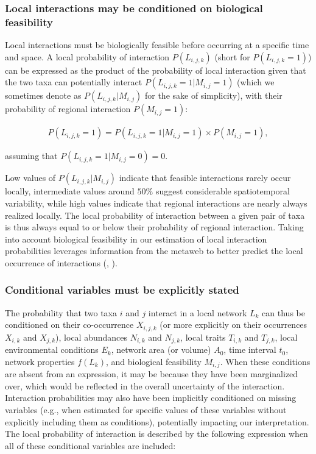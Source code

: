 \subsubsection{Local interactions may be conditioned on biological feasibility}

Local interactions must be biologically feasible before occurring at a specific
time and space. A local probability of interaction $P(L_{i, j, k})$ (short for
$P(L_{i, j, k} = 1)$) can be expressed as the product of the probability of
local interaction given that the two taxa can potentially interact $P(L_{i, j,
k} = 1 | M_{i, j} = 1)$ (which we sometimes denote as $P(L_{i, j, k}|M_{i, j})$
for the sake of simplicity), with their probability of regional interaction
$P(M_{i, j} = 1)$: 

\begin{eqnarray}
  \label{eq:local_meta}
  P(L_{i, j, k} = 1) = P(L_{i, j, k} = 1 | M_{i, j} = 1) \times P(M_{i, j} = 1),
\end{eqnarray}

assuming that $P(L_{i,j,k} = 1 | M_{i,j } = 0) = 0$.

Low values of $P(L_{i, j, k} | M_{i, j})$ indicate that feasible interactions
rarely occur locally, intermediate values around $50\%$ suggest considerable
spatiotemporal variability, while high values indicate that regional
interactions are nearly always realized locally. The local probability of
interaction between a given pair of taxa is thus always equal to or below their
probability of regional interaction. Taking into account biological feasibility
in our estimation of local interaction probabilities leverages information from
the metaweb to better predict the local occurrence of interactions
(\cite{Strydom2021Roadmapa}, \cite{Dansereau2024Spatially}).  

\subsubsection{Conditional variables must be explicitly stated} 

The probability that two taxa $i$ and $j$ interact in a local network $L_k$ can
thus be conditioned on their co-occurrence $X_{i,j,k}$ (or more explicitly on
their occurrences $X_{i,k}$ and $X_{j,k}$), local abundances $N_{i,k}$ and
$N_{j,k}$, local traits $T_{i,k}$ and $T_{j,k}$, local environmental conditions
$E_k$, network area (or volume) $A_0$, time interval $t_0$, network properties
$f(L_k)$, and biological feasibility $M_{i, j}$. When these conditions are
absent from an expression, it may be because they have been marginalized over,
which would be reflected in the overall uncertainty of the interaction.
Interaction probabilities may also have been implicitly conditioned on missing
variables (e.g., when estimated for specific values of these variables without
explicitly including them as conditions), potentially impacting our
interpretation. The local probability of interaction is described by the
following expression when all of these conditional variables are included:

